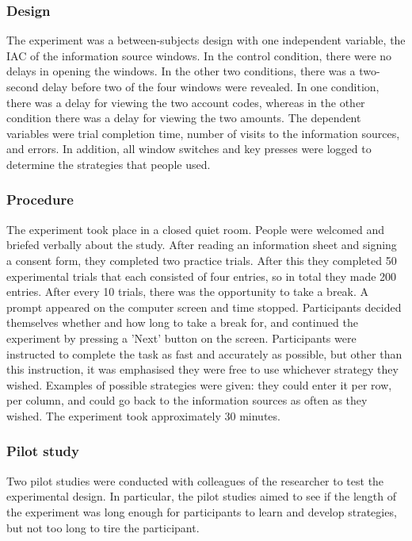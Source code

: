 \begin{table}
\begin{enumerate}
\subsubsection{Design}
The experiment was a between-subjects design with one independent variable, the IAC of the information source windows. In the control condition, there were no delays in opening the windows. In the other two conditions, there was a two-second delay before two of the four windows were revealed. In one condition, there was a delay for viewing the two account codes, whereas in the other condition there was a delay for viewing the two amounts. The dependent variables were trial completion time, number of visits to the information sources, and errors. In addition, all window switches and key presses were logged to determine the strategies that people used.

\subsubsection{Procedure}
The experiment took place in a closed quiet room. People were welcomed and briefed verbally about the study. After reading an information sheet and signing a consent form, they completed two practice trials. After this they completed 50 experimental trials that each consisted of four entries, so in total they made 200 entries. After every 10 trials, there was the opportunity to take a break. A prompt appeared on the computer screen and time stopped. Participants decided themselves whether and how long to take a break for, and continued the experiment by pressing a 'Next' button on the screen.
Participants were instructed to complete the task as fast and accurately as possible, but other than this instruction, it was emphasised they were free to use whichever strategy they wished. Examples of possible strategies were given: they could enter it per row, per column, and could go back to the information sources as often as they wished. The experiment took approximately 30 minutes.

\subsubsection{Pilot study}
Two pilot studies were conducted with colleagues of the researcher to test the experimental design. In particular, the pilot studies aimed to see if the length of the experiment was long enough for participants to learn and develop  strategies, but not too long to tire the participant.


\end{enumerate}
\end{table}
